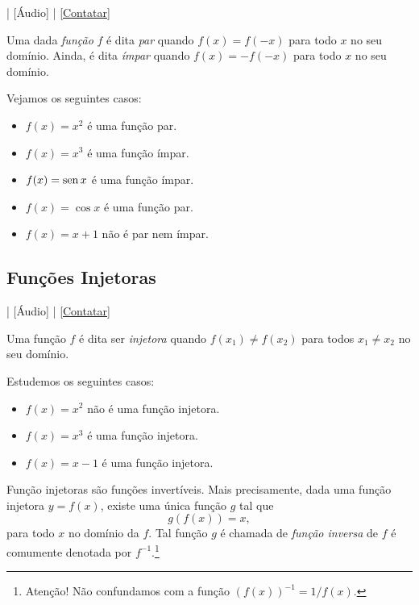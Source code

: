 \begin{flushright}
  [Vídeo] | [Áudio] | \href{https://phkonzen.github.io/notas/contato.html}{[Contatar]}
\end{flushright}

Uma dada \emph{função} $f$ é dita \emph{par} quando $f(x)=f(-x)$ para todo $x$ no seu domínio. Ainda, é dita \emph{ímpar} quando $f(x)=-f(-x)$ para todo $x$ no seu domínio.

\begin{ex}
  Vejamos os seguintes casos:
  \begin{itemize}
  \item $f(x) = x^2$ é uma função par.
  \item $f(x) = x^3$ é uma função ímpar.
  \item $f(x) = \operatorname{sen} x$ é uma função ímpar.
  \item $f(x) = \cos x$ é uma função par.
  \item $f(x) = x+1$ não é par nem ímpar.
  \end{itemize}
\end{ex}

\subsection{Funções Injetoras}

\begin{flushright}
  [Vídeo] | [Áudio] | \href{https://phkonzen.github.io/notas/contato.html}{[Contatar]}
\end{flushright}

Uma função $f$ é dita ser \emph{injetora} quando $f(x_1)\neq f(x_2)$ para todos $x_1\neq x_2$ no seu domínio.

\begin{ex}
  Estudemos os seguintes casos:
  \begin{itemize}
  \item $f(x) = x^2$ não é uma função injetora.
  \item $f(x) = x^3$ é uma função injetora.
  \item $f(x) = x-1$ é uma função injetora.
  \end{itemize}
\end{ex}

Função injetoras são funções invertíveis. Mais precisamente, dada uma função injetora $y = f(x)$, existe uma única função $g$ tal que
\begin{equation}
  g(f(x)) = x,
\end{equation}
para todo $x$ no domínio da $f$. Tal função $g$ é chamada de \emph{função inversa} de $f$ é comumente denotada por $f^{-1}$.\footnote{Atenção! Não confundamos com a função $(f(x))^{-1} = 1/f(x)$.}

